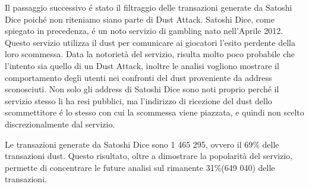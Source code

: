 Il passaggio successivo é stato il filtraggio delle transazioni generate da Satoshi Dice poiché non riteniamo siano parte di Dust Attack. Satoshi Dice, come spiegato in precedenza, é un noto servizio di gambling nato nell'Aprile 2012. Questo servizio utilizza il dust per comunicare ai giocatori l'esito perdente della loro scommessa. Data la notorietà del servizio, risulta molto poco probabile che l'intento sia quello di un Dust Attack, inoltre le analisi vogliono mostrare il comportamento degli utenti nei confronti del dust proveniente da address sconosciuti. Non solo gli address di Satoshi Dice sono noti proprio perché il servizio stesso li ha resi pubblici, ma l'indirizzo di ricezione del dust dello scommettitore é lo stesso con cui la scommessa viene piazzata, e quindi non scelto discrezionalmente dal servizio.

Le transazioni generate da Satoshi Dice sono 1 465 295, ovvero il 69\% delle transazioni dust. Questo risultato, oltre a dimostrare la popolarità del servizio, permette di concentrare le future analisi sul rimanente 31\%(649 040) delle transazioni.

